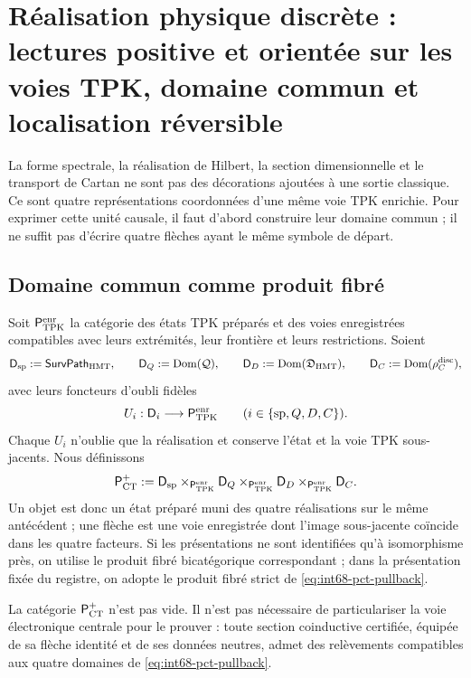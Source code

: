 \section[Réalisation physique discrète sur les voies TPK]{Réalisation physique
discrète : lectures positive et orientée sur les voies TPK, domaine commun et
localisation réversible}
\label{sec:int68-realizacion-fisica-discreta}

La forme spectrale, la réalisation de Hilbert, la section dimensionnelle et le
transport de Cartan ne sont pas des décorations ajoutées à une sortie classique. Ce sont
quatre représentations coordonnées d'une même voie TPK enrichie. Pour
exprimer cette unité causale, il faut d'abord construire leur domaine commun ; il ne
suffit pas d'écrire quatre flèches ayant le même symbole de départ.

\subsection{Domaine commun comme produit fibré}

Soit \(\mathsf P_{\rm TPK}^{\rm enr}\) la catégorie des états TPK préparés
et des voies enregistrées compatibles avec leurs extrémités, leur frontière et leurs restrictions.
Soient
\[
 \mathsf D_{\rm sp}:=\mathsf{SurvPath}_{\rm HMT},\qquad
 \mathsf D_Q:=\operatorname{Dom}(\mathcal Q),\qquad
 \mathsf D_D:=\operatorname{Dom}(\mathfrak D_{\rm HMT}),\qquad
 \mathsf D_C:=\operatorname{Dom}(\rho_C^{\rm disc}),
\]
avec leurs foncteurs d'oubli fidèles
\[
 U_i:\mathsf D_i\longrightarrow\mathsf P_{\rm TPK}^{\rm enr}
 \qquad(i\in\{{\rm sp},Q,D,C\}).
\]
Chaque \(U_i\) n'oublie que la réalisation et conserve l'état et la voie
TPK sous-jacents. Nous définissons
\begin{equation}
 \mathsf P_{\rm CT}^{+}
 :=
 \mathsf D_{\rm sp}
 \times_{\mathsf P_{\rm TPK}^{\rm enr}}\mathsf D_Q
 \times_{\mathsf P_{\rm TPK}^{\rm enr}}\mathsf D_D
 \times_{\mathsf P_{\rm TPK}^{\rm enr}}\mathsf D_C.
 \label{eq:int68-pct-pullback}
\end{equation}
Un objet est donc un état préparé muni des quatre
réalisations sur le même antécédent ; une flèche est une voie enregistrée
dont l'image sous-jacente coïncide dans les quatre facteurs. Si les
présentations ne sont identifiées qu'à isomorphisme près, on utilise le produit
fibré bicatégorique correspondant ; dans la présentation fixée du registre,
on adopte le produit fibré strict de
\eqref{eq:int68-pct-pullback}.

\begin{proposition}
\label{prop:int68-pct-no-vacio}
La catégorie \(\mathsf P_{\rm CT}^{+}\) n'est pas vide. Il n'est pas nécessaire de
particulariser la voie électronique centrale pour le prouver : toute section
coinductive certifiée, équipée de sa flèche identité et de ses données neutres, admet
des relèvements compatibles aux quatre domaines de
\eqref{eq:int68-pct-pullback}.
\end{proposition}

